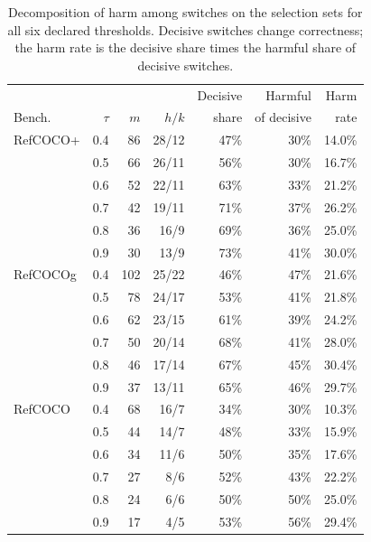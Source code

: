 \begin{table}[H]
\caption{Decomposition of harm among switches on the selection sets for all six
declared thresholds.  Decisive switches change correctness; the harm rate is the
decisive share times the harmful share of decisive switches.\label{tab:decomp-full}}
\centering
\small
\setlength{\tabcolsep}{3pt}
\begin{tabular}{@{}lrrrrrr@{}}
\toprule
& & & & Decisive & Harmful & Harm \\
Bench. & $\tau$ & $m$ & $h/k$ & share & of decisive & rate \\
\midrule
RefCOCO+ & 0.4 & 86 & 28/12 & 47\% & 30\% & 14.0\% \\
 & 0.5 & 66 & 26/11 & 56\% & 30\% & 16.7\% \\
 & 0.6 & 52 & 22/11 & 63\% & 33\% & 21.2\% \\
 & 0.7 & 42 & 19/11 & 71\% & 37\% & 26.2\% \\
 & 0.8 & 36 & 16/9 & 69\% & 36\% & 25.0\% \\
 & 0.9 & 30 & 13/9 & 73\% & 41\% & 30.0\% \\
\midrule
RefCOCOg & 0.4 & 102 & 25/22 & 46\% & 47\% & 21.6\% \\
 & 0.5 & 78 & 24/17 & 53\% & 41\% & 21.8\% \\
 & 0.6 & 62 & 23/15 & 61\% & 39\% & 24.2\% \\
 & 0.7 & 50 & 20/14 & 68\% & 41\% & 28.0\% \\
 & 0.8 & 46 & 17/14 & 67\% & 45\% & 30.4\% \\
 & 0.9 & 37 & 13/11 & 65\% & 46\% & 29.7\% \\
\midrule
RefCOCO & 0.4 & 68 & 16/7 & 34\% & 30\% & 10.3\% \\
 & 0.5 & 44 & 14/7 & 48\% & 33\% & 15.9\% \\
 & 0.6 & 34 & 11/6 & 50\% & 35\% & 17.6\% \\
 & 0.7 & 27 & 8/6 & 52\% & 43\% & 22.2\% \\
 & 0.8 & 24 & 6/6 & 50\% & 50\% & 25.0\% \\
 & 0.9 & 17 & 4/5 & 53\% & 56\% & 29.4\% \\
\bottomrule
\end{tabular}
\end{table}
